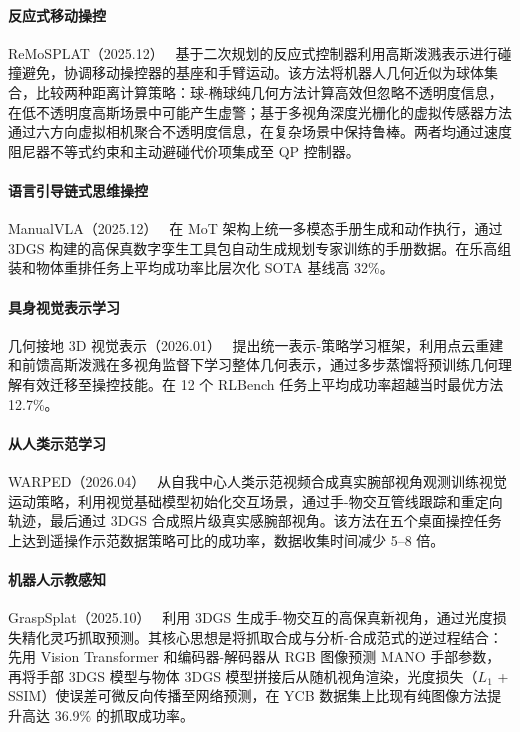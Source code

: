 \paragraph{反应式移动操控}

ReMoSPLAT（2025.12）~\cite{2512_09656} 基于二次规划的反应式控制器利用高斯泼溅表示进行碰撞避免，协调移动操控器的基座和手臂运动。该方法将机器人几何近似为球体集合，比较两种距离计算策略：球-椭球纯几何方法计算高效但忽略不透明度信息，在低不透明度高斯场景中可能产生虚警；基于多视角深度光栅化的虚拟传感器方法通过六方向虚拟相机聚合不透明度信息，在复杂场景中保持鲁棒。两者均通过速度阻尼器不等式约束和主动避碰代价项集成至 QP 控制器。

\paragraph{语言引导链式思维操控}

ManualVLA（2025.12）~\cite{2512_02013} 在 MoT 架构上统一多模态手册生成和动作执行，通过 3DGS 构建的高保真数字孪生工具包自动生成规划专家训练的手册数据。在乐高组装和物体重排任务上平均成功率比层次化 SOTA 基线高 32\%。

\paragraph{具身视觉表示学习}

几何接地 3D 视觉表示（2026.01）~\cite{2601_22988} 提出统一表示-策略学习框架，利用点云重建和前馈高斯泼溅在多视角监督下学习整体几何表示，通过多步蒸馏将预训练几何理解有效迁移至操控技能。在 12 个 RLBench 任务上平均成功率超越当时最优方法 12.7\%。

\paragraph{从人类示范学习}

WARPED（2026.04）~\cite{2604_10809} 从自我中心人类示范视频合成真实腕部视角观测训练视觉运动策略，利用视觉基础模型初始化交互场景，通过手-物交互管线跟踪和重定向轨迹，最后通过 3DGS 合成照片级真实感腕部视角。该方法在五个桌面操控任务上达到遥操作示范数据策略可比的成功率，数据收集时间减少 5--8 倍。

\paragraph{机器人示教感知}

GraspSplat（2025.10）~\cite{2510_19200} 利用 3DGS 生成手-物交互的高保真新视角，通过光度损失精化灵巧抓取预测。其核心思想是将抓取合成与分析-合成范式的逆过程结合：先用 Vision Transformer 和编码器-解码器从 RGB 图像预测 MANO 手部参数，再将手部 3DGS 模型与物体 3DGS 模型拼接后从随机视角渲染，光度损失（$L_1$ + SSIM）使误差可微反向传播至网络预测，在 YCB 数据集上比现有纯图像方法提升高达 36.9\% 的抓取成功率。

